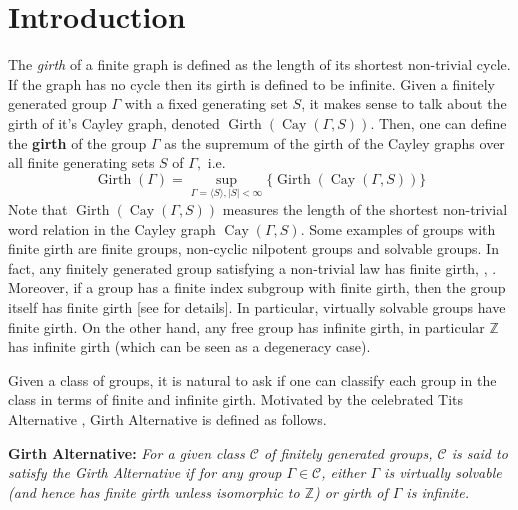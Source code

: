 \documentclass{amsart}
\theoremstyle{definition}
\newtheorem*{Notation warning}{Warning on notations}
\newtheorem*{Sketch of proof}{Sketch of proof for Theorem C}
\DeclareMathOperator{\Gir}{Girth}
\DeclareMathOperator{\Cay}{Cay}
\begin{document}
\maketitle
\begin{sloppypar}

\tableofcontents




\section{Introduction}

The \emph{girth} of a finite graph is defined as the length of its shortest non-trivial cycle.
If the graph has no cycle then its girth is defined to be infinite. 
Given a finitely generated group $\Gamma$ with a fixed generating set $S$, it makes sense to talk about the girth of it's Cayley graph, denoted $\Gir(\Cay(\Gamma,S))$. Then, one can define the \textbf{girth} of the group $\Gamma$ as the supremum of the girth of the Cayley graphs over all finite  generating sets $S$ of $\Gamma,$ i.e. 
$$\Gir(\Gamma)=\sup_{\Gamma=\langle S \rangle, |S|<\infty} \bigg \{\Gir(\Cay(\Gamma,S))\bigg \}$$
Note that $\Gir(\Cay(\Gamma,S))$ measures the length of the shortest non-trivial word relation in the Cayley graph $\Cay(\Gamma, S)$. Some examples of groups with finite girth are finite groups, non-cyclic nilpotent groups and solvable groups. In fact, any finitely generated group satisfying a non-trivial law has finite girth, \cite{Schleimer02}, \cite{AKHMEDOV2003198}. 
Moreover, if a group has a finite index subgroup with finite girth, then the group itself has finite girth [see \cite{Schleimer02} for details]. 
In particular, virtually solvable groups have finite girth.
On the other hand, any free group has infinite girth, in particular $\mathbb{Z}$ has infinite girth (which can be seen as a degeneracy case).

\medskip

Given a class of groups, it is natural to ask if one can classify each group in the class in terms of finite and infinite girth. Motivated by the celebrated Tits Alternative \cite{Tits1972FreeSI}, Girth Alternative \cite{akhmedov2005girth} is defined as follows.
\medskip

\noindent
\textbf{Girth Alternative:} \label{thm: GA}\textit{For a given class $\mathcal{C}$ of finitely generated groups, $\mathcal{C}$ is said to satisfy the Girth Alternative if for any group $\Gamma\in \mathcal{C}$, either $\Gamma$ is virtually solvable (and hence has finite girth unless isomorphic to $\mathbb{Z}$) or girth of $\Gamma$ is infinite.}
\medskip


\end{sloppypar}
\end{document}
